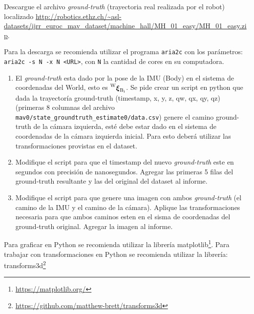 \documentclass[tp]{lcc}
\begin{document}
Descargue el archivo \emph{ground-truth} (trayectoria real realizada por el robot) localizado \url{http://robotics.ethz.ch/~asl-datasets/ijrr_euroc_mav_dataset/machine_hall/MH_01_easy/MH_01_easy.zip}.

\begin{nota}
	Para la descarga se recomienda utilizar el programa \lstinline{aria2c} con los parámetros: \lstinline{aria2c -s N -x N <URL>}, con \lstinline{N} la cantidad de cores en su computadora.
\end{nota}

\begin{enumerate}
    \item El \emph{ground-truth} esta dado por la pose de la IMU (Body) en el sistema de coordenadas del World, esto es $\prescript{\mathrm{\mathrm{W}}}{}{{\boldsymbol{\mathbf{\xi}}}_\mathrm{\mathrm{B}_{i}}}$. Se pide crear un script en python que dada la trayectoría ground-truth (timestamp, x, y, z, qw, qx, qy, qz) (primeras 8 columnas del archivo \lstinline{mav0/state_groundtruth_estimate0/data.csv}) genere el camino ground-truth de la cámara izquierda, esté debe estar dado en el sistema de coordenadas de la cámara izquierda inicial. Para esto deberá utilizar las transformaciones provistas en el dataset.
    
    \item Modifique el script para que el timestamp del nuevo \emph{ground-truth} este en segundos con precisión de nanosegundos. Agregar las primeras 5 filas del ground-truth resultante y las del original del dataset al informe.
    
    \item Modifique el script para que genere una imagen con ambos \emph{ground-truth} (el camino de la IMU y el camino de la cámara). Aplique las transformaciones necesaria para que ambos caminos esten en el sisma de coordenadas del ground-truth original. Agregar la imagen al informe.
\end{enumerate}

\begin{nota}
	Para graficar en Python se recomienda utilizar la librería matplotlib\footnote{\url{https://matplotlib.org/}}. Para trabajar con transformaciones en Python se recomienda utilizar la librería: transforms3d\footnote{\url{https://github.com/matthew-brett/transforms3d}}
\end{nota}
\end{document}

